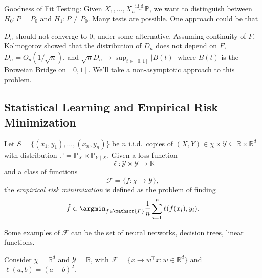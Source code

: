 \chapter{}

\begin{prev}
	Goodness of Fit Testing: Given \(X_1, \dots , X_n \overset{\text{i.i.d.}}{\sim } \mathbb{P} \), we want to distinguish between \(H_0 \colon P = P_0\) and \(H_1\colon P \neq P_0\). Many tests are possible. One approach could be that

	\(D_n\) should not converge to \(0\), under some alternative. Assuming continuity of \(F\), Kolmogorov showed that the distribution of \(D_n\) does not depend on \(F\), \(D_n = O_p(1 / \sqrt{n} )\), and \(\sqrt{n} D_n \to \sup _{t\in [0, 1]} \vert B(t) \vert \) where \(B(t)\) is the Broweian Bridge on \([0, 1]\). We'll take a non-asymptotic approach to this problem.
\end{prev}

\section{Statistical Learning and Empirical Risk Minimization}




\begin{problem}\label{prb:ERM}
Let \(S = \{ (x_1, y_1) , \dots , (x_n, y_n)\} \) be \(n\) i.i.d.\ copies of \((X, Y) \in \chi \times \mathscr{Y} \subseteq \mathbb{R} \times \mathbb{R} ^d\) with distribution \(\mathbb{P} = \mathbb{P} _X \times \mathbb{P} _{Y \mid X}\). Given a loss function
\[
	\ell \colon \mathscr{Y} \times \mathscr{Y} \to \mathbb{R}
\]
and a class of functions
\[
	\mathscr{F} = \{ f\colon \chi \to \mathscr{Y}  \} ,
\]
the \emph{empirical risk minimization} is defined as the problem of finding
\[
	\hat{f} \in \argmin_{f\in \mathscr{F} } \frac{1}{n}\sum_{i=1}^{n} \ell (f(x_i), y_i).
\]
\end{problem}

\begin{eg}
	Some examples of \(\mathscr{F} \) can be the set of neural networks, decision trees, linear functions.
\end{eg}

\begin{eg}
	Consider \(\chi = \mathbb{R} ^d\) and \(\mathscr{Y} = \mathbb{R} \), with \(\mathscr{F} = \{ x \to w^{\top} x \colon w\in \mathbb{R} ^d \} \) and \(\ell (a, b) = (a - b)^2\).
\end{eg}

